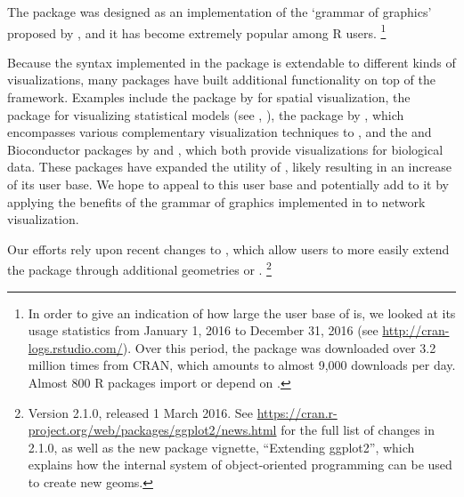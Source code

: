 \par The  package was designed as an implementation of the `grammar of graphics' proposed by \citet{wilkinson:1999}, and it has become extremely popular among R users.%
\footnote{In order to give an indication of how  large the user base of  is, we looked at its usage statistics from January 1, 2016 to December 31, 2016 (see \url{http://cran-logs.rstudio.com/}). Over this period, the  package was downloaded over 3.2 million times from CRAN, which amounts to almost 9,000 downloads per day. Almost 800 R packages import or depend on .} 

Because the syntax implemented in the  package is extendable to  different kinds of visualizations, many packages have built additional functionality on top of the   framework. Examples include the  package by \citet{ggmap} for spatial visualization, the  package for visualizing statistical models (see \citet{ggfortify}, \citet{ggfortify2}), the package  by \citet{ggally}, which encompasses various complementary visualization techniques to , and the  and  Bioconductor packages by \citet{ggbio} and \citet{ggtree}, which both provide visualizations for biological data.
These packages have expanded the utility of , likely resulting in an  increase of its user base. We hope to appeal to this user base and potentially add to it by applying the benefits of the grammar of graphics implemented in  to network visualization.

Our efforts rely upon recent changes to , which allow users to more easily extend the package through additional geometries or .%
\footnote{Version 2.1.0, released 1 March 2016. See \url{https://cran.r-project.org/web/packages/ggplot2/news.html} for the full list of changes in  2.1.0, as well as the new package vignette, ``Extending ggplot2'', which explains how the internal  system of object-oriented programming can be used to create new geoms.} 

